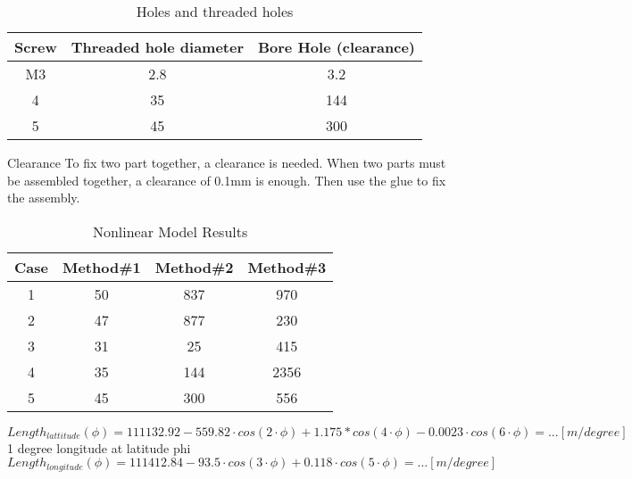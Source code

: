 \documentclass[12pt,a4paper]{article}
\begin{document}
	\begin{table}[ht]
		\caption{Holes and threaded holes} %
		\centering %
		\begin{tabular}{c c c} %
			\hline\hline %
			Screw & Threaded hole diameter & Bore Hole (clearance) \\ [0.5ex] %
			\hline %
			M3 & 2.8 & 3.2 \\ %
			4 & 35 & 144 \\
			5 & 45 & 300 \\ [1ex] %
			\hline %
		\end{tabular}\label{table:nonlin} %
	\end{table}
	
	Clearance
	To fix two part together, a clearance is needed.
	When two parts must be assembled together, a clearance of 0.1mm is enough. Then use the glue to fix the assembly. 
	
	
	
	\begin{table}[ht]
		\caption{Nonlinear Model Results} %
		\centering %
		\begin{tabular}{c c c c} %
			\hline\hline %
			Case & Method\#1 & Method\#2 & Method\#3 \\ [0.5ex] %
			\hline %
			1 & 50 & 837 & 970 \\ %
			2 & 47 & 877 & 230 \\
			3 & 31 & 25 & 415 \\
			4 & 35 & 144 & 2356 \\
			5 & 45 & 300 & 556 \\ [1ex] %
			\hline %
		\end{tabular}\label{table:nonlin} %
	\end{table}
	
	
	
	\begin{equation}
		Length_{lattitude}(\phi) = 111132.92-559.82 \cdot cos(2 \cdot \phi)+1.175*cos(4 \cdot \phi)-0.0023 \cdot cos(6 \cdot \phi)= ... [m/degree]
	\end{equation}
	1 degree longitude at latitude phi
	\begin{equation}
		Length_{longitude}(\phi) =
		111412.84-93.5 \cdot cos(3 \cdot \phi)+ 0.118 \cdot cos(5 \cdot \phi)= ... [m/degree]
	\end{equation}
	
\end{document}
